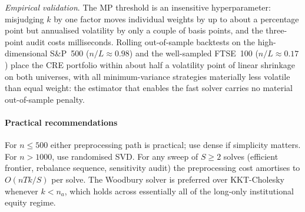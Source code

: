 \emph{Empirical validation}. The MP threshold is an insensitive hyperparameter:
misjudging $k$ by one factor moves individual weights by up to about a percentage
point but annualised volatility by only a couple of basis points, and the
three-point audit costs milliseconds.
Rolling out-of-sample backtests on the high-dimensional S\&P~500
($n/L \approx 0.98$) and the well-sampled FTSE~100 ($n/L \approx 0.17$) place the
CRE portfolio within about half a volatility point of linear shrinkage on both
universes, with all minimum-variance strategies materially less volatile than
equal weight: the estimator that enables the fast solver carries no material
out-of-sample penalty.

\paragraph{Practical recommendations}
For $n \leq 500$ either preprocessing path is practical; use dense if simplicity
matters. For $n > 1000$, use randomised SVD. For any sweep of $S \geq 2$ solves
(efficient frontier, rebalance sequence, sensitivity audit) the preprocessing cost
amortises to $O(nTk/S)$ per solve. The Woodbury solver is preferred over
KKT-Cholesky whenever $k < n_a$, which holds across essentially all of the
long-only institutional equity regime.
